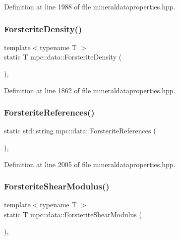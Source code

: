 Definition at line 1988 of file mineraldataproperties.\+hpp.

\mbox{\label{namespacempc_1_1data_ac84316afdcfa54817a1d37bd19919895}} 
\subsubsection{\texorpdfstring{Forsterite\+Density()}{ForsteriteDensity()}}
{\footnotesize\ttfamily template$<$typename T $>$ \\
static T mpc\+::data\+::\+Forsterite\+Density (\begin{DoxyParamCaption}{ }\end{DoxyParamCaption})\hspace{0.3cm}{\ttfamily [inline]}, {\ttfamily [static]}}



Definition at line 1862 of file mineraldataproperties.\+hpp.

\mbox{\label{namespacempc_1_1data_ad110ad42cf202e8ab9150a773e99ee19}} 
\subsubsection{\texorpdfstring{Forsterite\+References()}{ForsteriteReferences()}}
{\footnotesize\ttfamily static std\+::string mpc\+::data\+::\+Forsterite\+References (\begin{DoxyParamCaption}{ }\end{DoxyParamCaption})\hspace{0.3cm}{\ttfamily [inline]}, {\ttfamily [static]}}



Definition at line 2005 of file mineraldataproperties.\+hpp.

\mbox{\label{namespacempc_1_1data_a108126c94117a379306d34b24b4167dc}} 
\subsubsection{\texorpdfstring{Forsterite\+Shear\+Modulus()}{ForsteriteShearModulus()}}
{\footnotesize\ttfamily template$<$typename T $>$ \\
static T mpc\+::data\+::\+Forsterite\+Shear\+Modulus (\begin{DoxyParamCaption}{ }\end{DoxyParamCaption})\hspace{0.3cm}{\ttfamily [inline]}, {\ttfamily [static]}}



